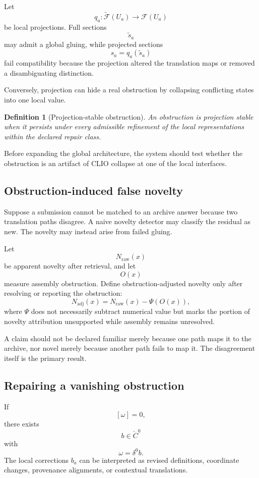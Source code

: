 \documentclass[11pt]{article}
\newtheorem{definition}{Definition}[section]
\theoremstyle{definition}
\begin{document}
Let
\[
q_a:\widetilde{\mathscr F}(U_a)\to\mathscr F(U_a)
\]
be local projections. Full sections
\[
\widetilde s_a
\]
may admit a global gluing, while projected sections
\[
s_a=q_a(\widetilde s_a)
\]
fail compatibility because the projection altered the translation maps or removed a disambiguating distinction.

Conversely, projection can hide a real obstruction by collapsing conflicting states into one local value.

\begin{definition}[Projection-stable obstruction]
An obstruction is projection stable when it persists under every admissible refinement of the local representations within the declared repair class.
\end{definition}

Before expanding the global architecture, the system should test whether the obstruction is an artifact of CLIO collapse at one of the local interfaces.

\subsection{Obstruction-induced false novelty}

Suppose a submission cannot be matched to an archive answer because two translation paths disagree. A naive novelty detector may classify the residual as new. The novelty may instead arise from failed gluing.

Let
\[
N_{\mathrm{raw}}(x)
\]
be apparent novelty after retrieval, and let
\[
O(x)
\]
measure assembly obstruction. Define obstruction-adjusted novelty only after resolving or reporting the obstruction:
\[
N_{\mathrm{adj}}(x)
=
N_{\mathrm{raw}}(x)
-
\Psi(O(x)),
\]
where \(\Psi\) does not necessarily subtract numerical value but marks the portion of novelty attribution unsupported while assembly remains unresolved.

A claim should not be declared familiar merely because one path maps it to the archive, nor novel merely because another path fails to map it. The disagreement itself is the primary result.

\subsection{Repairing a vanishing obstruction}

If
\[
[\omega]=0,
\]
there exists
\[
b\in\check C^0
\]
with
\[
\omega=\delta^0b.
\]
The local corrections \(b_a\) can be interpreted as revised definitions, coordinate changes, provenance alignments, or contextual translations.
\end{document}
